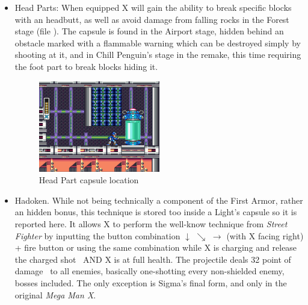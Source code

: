 \begin{itemize}
	
	\item Head Parts: When equipped X will gain the ability to break specific blocks with an headbutt, as well as avoid damage from falling rocks in the Forest stage (file ). The capsule is found in the Airport stage, hidden behind an obstacle marked with a flammable warning which can be destroyed simply by shooting at it, and in Chill Penguin's stage in the remake, this time requiring the foot part to break blocks hiding it.
	\begin{figure}[htp]
		\centering
		\includegraphics[width=0.5\textwidth]{figures/X1/Storm_eagle/Storm_armor_2.jpg}
		\caption{Head Part capsule location}
	\end{figure}
	
	\item Hadoken. While not being technically a component of the First Armor, rather an hidden bonus, this technique is stored too inside a Light's capsule so it is reported here. It allows X to perform the well-know technique from \textit{Street Fighter} by inputting the button combination $\downarrow$ $\searrow$ $\rightarrow$ (with X facing right) + fire button or using the same combination while X is charging and release the charged shot~\cite{RTA_wiki:X1}  AND X is at full health. The projectile deals 32 point of damage~\cite{wiki:Hadoken} to all enemies, basically one-shotting every non-shielded enemy, bosses included. The only exception is Sigma's final form, and only in the original \textit{Mega Man X}. 
	

\end{itemize}
